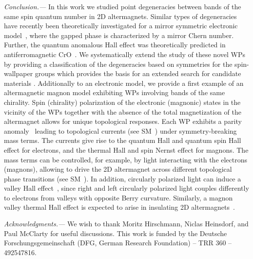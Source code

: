 \documentclass[aps,prb,twocolumn,amsmath,amssymb,floatfix]{revtex4-2}
\begin{document}
\textit{Conclusion.---} 
In this work we studied point degeneracies between bands of the same spin quantum number in 2D altermagnets. Similar types of degeneracies have recently been theoretically investigated for a mirror symmetric electronic model~\cite{antonenko2024mirror}, where the gapped phase is characterized by a mirror Chern number. Further, the quantum anomalous Hall effect was theoretically predicted in antiferromagnetic CrO~\cite{2023npjCM,10.1063/5.0147450}.
We systematically extend the study of these novel WPs by providing a classification of the degeneracies based on symmetries for the spin-wallpaper groups which provides the basis for an extended search for candidate materials \cite{sodequist2024twodimensional}. 
Additionally to an electronic model, we provide a first example of an altermagnetic magnon model exhibiting WPs involving bands of the same  chirality.
Spin (chirality) polarization of the electronic (magnonic) states in the vicinity of the WPs together with the absence of the total magnetization of the altermagnet allows for unique topological responses. 
Each WP exhibits a parity anomaly~\cite{PhysRevD.29.2366,semenoff_anomaly_PRL,wenbin_parity_anomaly_PRB} leading to topological currents (see SM~\cite{sm_note}) under symmetry-breaking mass terms. The currents give rise to the quantum Hall and quantum spin Hall effect for electrons, and the thermal Hall and spin Nernst effect for magnons.
The mass terms can be controlled, for example, by light interacting with the electrons (magnons), allowing
to drive the 2D altermagnet across different topological 
phase transitions (see SM~\cite{sm_note}). 
In addition, circularly polarized light can induce a valley Hall effect~\cite{PhysRevLett.99.236809},
since right and left circularly polarized light couples differently to electrons from valleys with opposite  Berry curvature. 
Similarly, a magnon valley thermal Hall effect is expected to arise in insulating 2D altermagnets~\cite{PhysRevB.102.075407}.


\textit{Acknowledgments.---} 
We wish to thank Moritz Hirschmann, Niclas Heinsdorf, and Paul McClarty for useful discussions.
This work is funded by the Deutsche Forschungsgemeinschaft (DFG, German Research Foundation) – TRR 360 – 492547816.







\clearpage
\end{document}
